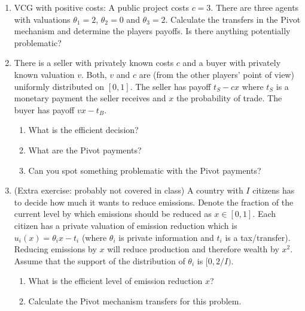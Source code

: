 \documentclass[a4paper,12pt]{article}
\begin{document}
\begin{enumerate}
\item VCG with positive costs: A public project costs $c=3$. There are three agents with valuations $\theta _1=2$, $\theta _2=0$ and $\theta _3=2$. Calculate the transfers in the Pivot mechanism and determine the players payoffs. Is there anything potentially problematic?
\item There is a seller with privately known costs $c$ and a buyer with privately known valuation $v$. Both, $v$ and $c$ are (from the other players' point of view) uniformly distributed on $[0,1]$. The seller has payoff $t_S-c x$ where $t_S$ is a monetary payment the seller receives and $x$ the probability of trade. The buyer has payoff $vx-t_B$.
  \begin{enumerate}
  \item What is the efficient decision?
  \item What are the Pivot payments?
    \item Can you spot something problematic with the Pivot payments?
    \end{enumerate}
\item (Extra exercise: probably not covered in class) A country with $I$ citizens has to decide how much it wants to reduce emissions. Denote the fraction of the current level by which emissions should be reduced as $x\in[0,1]$. Each citizen has a private valuation of emission reduction which is $u_i(x)=\theta _ix-t_i$ (where $\theta _i$ is private information and $t_i$ is a tax/transfer). Reducing emissions by $x$ will reduce production and therefore wealth by $x^2$. Assume that the support of the distribution of $\theta _i$ is $[0,2/I)$.
  \begin{enumerate}
  \item What is the efficient level of emission reduction $x$?
    \item Calculate the Pivot mechanism transfers for this problem.
  \end{enumerate}
\end{enumerate}



\end{document}
